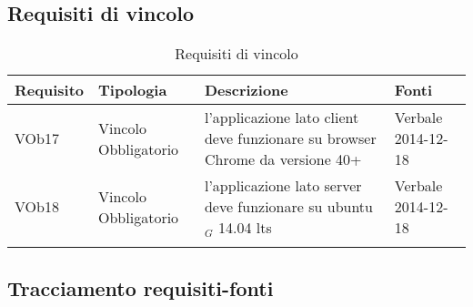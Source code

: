 \subsection{ Requisiti di vincolo}
	
\begin{longtable}{|l|p{2.5cm}|p{5cm}|p{3.5cm}|}
\hline
\textbf{Requisito} & \textbf{Tipologia} & \textbf{Descrizione} & \textbf{Fonti} \\
\hline
VOb17 & Vincolo \linebreak Obbligatorio & l'applicazione lato client deve funzionare su browser Chrome da versione 40+ & Verbale 2014-12-18 \linebreak \\
\hline
VOb18 & Vincolo \linebreak Obbligatorio & l'applicazione lato server deve funzionare su ubuntu$_G$ 14.04 lts & Verbale 2014-12-18 \linebreak \\
\hline
\caption{Requisiti di vincolo}
\end{longtable}

\newpage
\subsection{ Tracciamento requisiti-fonti}
	
